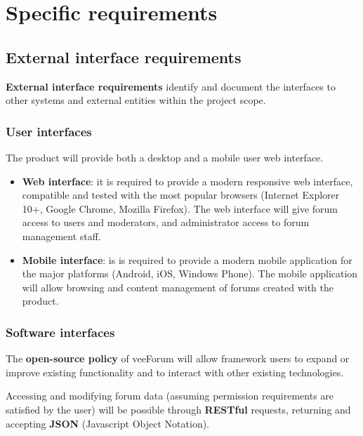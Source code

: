 \documentclass[12pt]{report}
\renewcommand\emph{\textbf}
\begin{document}
            \section{Specific requirements}

                \subsection{External interface requirements}

                    \emph{External interface requirements} identify and document the interfaces to other systems and external entities within the project scope.

                    \subsubsection{User interfaces}
                        The product will provide both a desktop and a mobile user web interface.

                        \begin{itemize}
                            \item \emph{Web interface}: it is required to provide a modern responsive web interface, compatible and tested with the most popular browsers (Internet Explorer 10+, Google Chrome, Mozilla Firefox). The web interface will give forum access to users and moderators, and administrator access to forum management staff.
                            \item \emph{Mobile interface}: is is required to provide a modern mobile application for the major platforms (Android, iOS, Windows Phone). The mobile application will allow browsing and content management of forums created with the product.
                        \end{itemize}

                    \subsubsection{Software interfaces}
                        The \emph{open-source policy} of veeForum will allow framework users to expand or improve existing functionality and to interact with other existing technologies.

                        Accessing and modifying forum data (assuming permission requirements are satisfied by the user) will be possible through \emph{RESTful} requests, returning and accepting \emph{JSON} (Javascript Object Notation).
\end{document}
